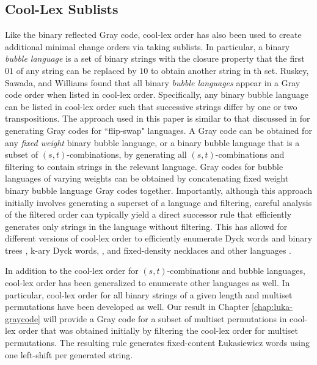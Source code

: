 \subsection{Cool-Lex Sublists}

Like the binary reflected Gray code, cool-lex order has also been used to create additional minimal change orders via taking sublists. In particular, a binary \emph{bubble language} is a set of binary strings with the closure property that the first $01$ of any string can be replaced by $10$ to obtain another string in th set.  Ruskey, Sawada, and Williams found that all binary \emph{bubble languages} appear in a Gray code order when listed in cool-lex order.  Specifically, any binary bubble language can be listed in cool-lex order such that successive strings differ by one or two transpositions.  The approach used in this paper is similar to that discussed in \cite{sawada2021inside} for generating Gray codes for ``flip-swap" languages.  A Gray code can be obtained for any \emph{fixed weight} binary bubble language, or a binary bubble language that is a subset of $(s,t)$-combinations, by generating all $(s,t)$-combinations and filtering to contain strings in the relevant language.  Gray codes for bubble languages of varying weights can be obtained by concatenating fixed weight binary bubble language Gray codes together.
Importantly, although this approach initially involves generating a superset of a language and filtering, careful analysis of the filtered order can typically yield a direct successor rule that efficiently generates only strings in the language without filtering.  This has allowd for different versions of cool-lex order to efficiently enumerate Dyck words and binary trees \cite{ruskey2008generating}, k-ary Dyck words, \cite{durocher2012cool}, and fixed-density necklaces and other languages \cite{sawada2009fixed}.  

In addition to the cool-lex order for $(s,t)$-combinations and bubble languages, cool-lex order has been generalized to enumerate other languages as well.  In particular, cool-lex order for all binary strings of a given length \cite{stevens2012coolest} and multiset permutations \cite{williams2009loopless} have been developed as well.  Our result in Chapter \ref{chap:luka-graycode} will provide a Gray code for a subset of multiset permutations in cool-lex order that was obtained initially by filtering the cool-lex order for multiset permutations.  The resulting rule generates fixed-content Łukasiewicz words using one left-shift per generated string.


